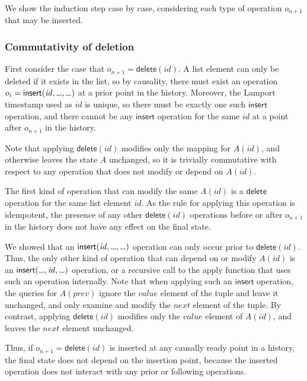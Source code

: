 \documentclass[a4paper,twocolumn,10pt]{article}
\newcommand{\placeholder}{%
  \makebox[0.7em]{%
    \kern.07em
    \vrule height.3ex
    \hrulefill
    \vrule height.3ex
    \kern.07em
  }%
}
\begin{document}
We show the induction step case by case, considering each type of operation $o_{n+1}$ that may be inserted.

\subsubsection{Commutativity of deletion}

First consider the case that $o_{n+1}=\mathsf{delete}(\mathit{id})$. A list element can only be deleted if it exists in the list, so by causality, there must exist an operation $o_i=\mathsf{insert}(\mathit{id}, \placeholder, \placeholder)$ at a prior point in the history. Moreover, the Lamport timestamp used as $\mathit{id}$ is unique, so there must be exactly one such $\mathsf{insert}$ operation, and there cannot be any $\mathsf{insert}$ operation for the same $\mathit{id}$ at a point after $o_{n+1}$ in the history.

Note that applying $\mathsf{delete}(\mathit{id})$ modifies only the mapping for $A(\mathit{id})$, and otherwise leaves the state $A$ unchanged, so it is trivially commutative with respect to any operation that does not modify or depend on $A(\mathit{id})$.

The first kind of operation that can modify the same $A(\mathit{id})$ is a $\mathsf{delete}$ operation for the same list element $\mathit{id}$. As the rule for applying this operation is idempotent, the presence of any other $\mathsf{delete}(\mathit{id})$ operations before or after $o_{n+1}$ in the history does not have any effect on the final state.

We showed that an $\mathsf{insert}(\mathit{id}, \placeholder, \placeholder)$ operation can only occur prior to $\mathsf{delete}(\mathit{id})$. Thus, the only other kind of operation that can depend on or modify $A(\mathit{id})$ is an $\mathsf{insert}(\placeholder, \mathit{id}, \placeholder)$ operation, or a recursive call to the $\mathrm{apply}$ function that uses such an operation internally. Note that when applying such an $\mathsf{insert}$ operation, the queries for $A(\mathit{prev})$ ignore the $\mathit{value}$ element of the tuple and leave it unchanged, and only examine and modify the $\mathit{next}$ element of the tuple. By contrast, applying $\mathsf{delete}(\mathit{id})$ modifies only the $\mathit{value}$ element of $A(\mathit{id})$, and leaves the $\mathit{next}$ element unchanged.

Thus, if $o_{n+1}=\mathsf{delete}(\mathit{id})$ is inserted at any causally ready point in a history, the final state does not depend on the insertion point, because the inserted operation does not interact with any prior or following operations.
\end{document}
